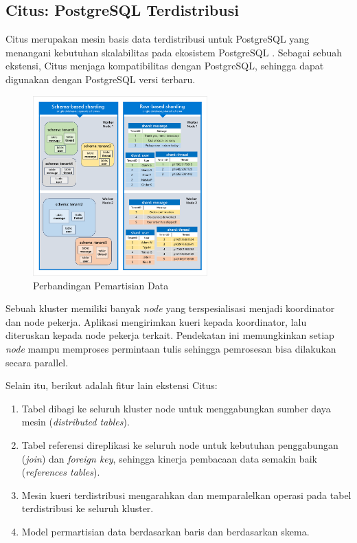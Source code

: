 \subsection{Citus: PostgreSQL Terdistribusi}

Citus merupakan mesin basis data terdistribusi untuk PostgreSQL yang menangani kebutuhan skalabilitas pada ekosistem PostgreSQL \parencite{citus}. Sebagai sebuah ekstensi, Citus menjaga kompatibilitas dengan PostgreSQL, sehingga dapat digunakan dengan PostgreSQL versi terbaru.

\begin{figure}[htbp]
    \centering
    \includegraphics[width=0.6\textwidth]{resources/chapter-2/row-vs-schema-sharding.png}
    \caption{Perbandingan Pemartisian Data \parencite{schemaBasedSharding}}
    \label{fig:row-vs-schema-sharding}
\end{figure}

Sebuah kluster memiliki banyak \textit{node} yang terspesialisasi menjadi koordinator dan node pekerja. Aplikasi mengirimkan kueri kepada koordinator, lalu diteruskan kepada node pekerja terkait. Pendekatan ini memungkinkan setiap \textit{node} mampu memproses permintaan tulis sehingga pemrosesan bisa dilakukan secara parallel.

Selain itu, berikut adalah fitur lain ekstensi Citus:

\begin{enumerate}
    \item Tabel dibagi ke seluruh kluster node untuk menggabungkan sumber daya mesin (\textit{distributed tables}).
    \item Tabel referensi direplikasi ke seluruh node untuk kebutuhan penggabungan (\textit{join}) dan \textit{foreign key}, sehingga kinerja pembacaan data semakin baik (\textit{references tables}).
    \item Mesin kueri terdistribusi mengarahkan dan memparalelkan operasi pada tabel terdistribusi ke seluruh kluster.
    \item Model permartisian data berdasarkan baris dan berdasarkan skema.
\end{enumerate}
